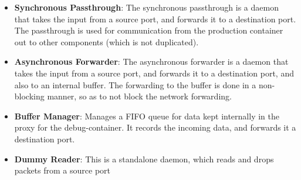 \begin{itemize}[leftmargin=*]
	\item \textbf{Synchronous Passthrough}: The synchronous passthrough is a daemon that takes the input from a source port, and forwards it to a destination port. The passthrough is used for communication from the production container out to other components (which is not duplicated).
	\item \textbf{Asynchronous Forwarder}: The asynchronous forwarder is a daemon that takes the input from a source port, and forwards it to a destination port, and also to an internal buffer. The forwarding to the buffer is done in a non-blocking manner, so as to not block the network forwarding. 
	\item \textbf{Buffer Manager}: Manages a FIFO queue for data kept internally in the proxy for the debug-container.
	It records the incoming data, and forwards it a destination port. 
	\item \textbf{Dummy Reader}: This is a standalone daemon, which reads and drops packets from a source port
\end{itemize}

\noindent

